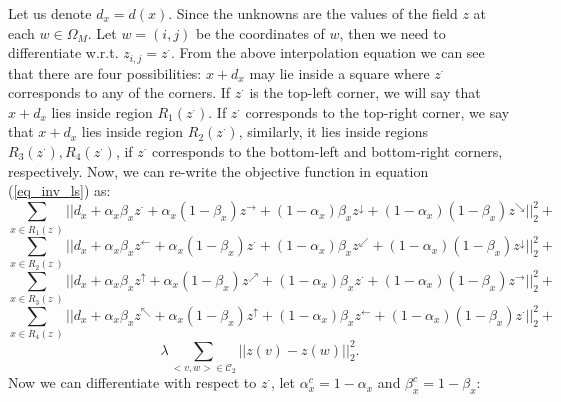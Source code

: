 \documentclass[11pt]{article}
\begin{document}
Let us denote $d_{x} = d(x)$. Since the unknowns are the values of the field $z$ at each $w\in\Omega_{M}$. Let $w=(i,j)$ be the coordinates of $w$, then we need to differentiate w.r.t. $z_{i,j}=z^{\cdot}$. From the above interpolation equation we can see that there are four possibilities: $x+d_{x}$ may lie inside a square where $z^{\cdot}$ corresponds to any of the corners. If $z^{\cdot}$ is the top-left corner, we will say that $x+d_{x}$ lies inside region $R_{1}(z^{\cdot})$. If $z^{\cdot}$ corresponds to the top-right corner, we say that $x+d_{x}$ lies inside region $R_{2}(z^{\cdot})$, similarly, it lies inside regions $R_{3}(z^{\cdot}), R_{4}(z^{\cdot})$, if $z^{\cdot}$ corresponds to the bottom-left and bottom-right corners, respectively. Now, we can re-write the objective function in equation (\ref{eq_inv_ls}) as:
\begin{displaymath}
	\sum_{x\in R_{1}(z^{\cdot})}||d_x + \alpha_{x}\beta_{x}z^{\cdot} + \alpha_{x}(1-\beta_{x})z^{\rightarrow} + (1-\alpha_{x})\beta_{x}z^{\downarrow} + (1-\alpha_{x})(1-\beta_{x})z^{\searrow}||_{2}^{2} +
\end{displaymath}
\begin{displaymath}
	\sum_{x\in R_{2}(z^{\cdot})}||d_x + \alpha_{x}\beta_{x}z^{\leftarrow} + \alpha_{x}(1-\beta_{x})z^{\cdot} + (1-\alpha_{x})\beta_{x}z^{\swarrow} + (1-\alpha_{x})(1-\beta_{x})z^{\downarrow}||_{2}^{2} +
\end{displaymath}
\begin{displaymath}
	\sum_{x\in R_{3}(z^{\cdot})}||d_x + \alpha_{x}\beta_{x}z^{\uparrow} + \alpha_{x}(1-\beta_{x})z^{\nearrow} + (1-\alpha_{x})\beta_{x}z^{\cdot} + (1-\alpha_{x})(1-\beta_{x})z^{\rightarrow}||_{2}^{2} +
\end{displaymath}
\begin{displaymath}
	\sum_{x\in R_{4}(z^{\cdot})}||d_x + \alpha_{x}\beta_{x}z^{\nwarrow} + \alpha_{x}(1-\beta_{x})z^{\uparrow} + (1-\alpha_{x})\beta_{x}z^{\leftarrow} + (1-\alpha_{x})(1-\beta_{x})z^{\cdot}||_{2}^{2} +
\end{displaymath}
\begin{displaymath}
	\lambda \sum_{<v,w>\in \mathcal{C}_{2}} ||z(v) -z(w)||_{2}^{2}.
\end{displaymath}
\newpage
Now we can differentiate with respect to $z^{\cdot}$, let $\alpha_{x}^{c}=1-\alpha_{x}$ and $\beta_{x}^{c} = 1-\beta_{x}$:
\end{document}
